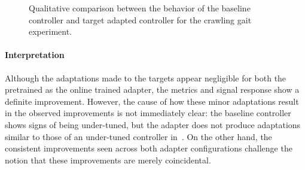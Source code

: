 \begin{figure}
    \centering
    
    \vspace*{-2em}
    \caption{Qualitative comparison between the behavior of the baseline controller and target adapted controller for the crawling gait experiment.}
    \label{fig:crawl-qualitative}
\end{figure}

\paragraph*{Interpretation}
Although the adaptations made to the targets appear negligible for both the pretrained as the online trained adapter, the metrics and signal response show a definite improvement.
However, the cause of how these minor adaptations result in the observed improvements is not immediately clear: the baseline controller shows signs of being under-tuned, but the adapter does not produce adaptations similar to those of an under-tuned controller in~.
On the other hand, the consistent improvements seen across both adapter configurations challenge the notion that these improvements are merely coincidental.
